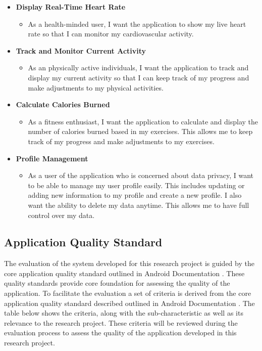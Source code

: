 \begin{itemize}[label={},leftmargin=*]
    \item \textbf{Display Real-Time Heart Rate}
      \begin{itemize}[label={},leftmargin=*]
        \item As a health-minded user, I want the application to show my live heart rate so that I can monitor my cardiovascular activity.
      \end{itemize}

    \item \textbf{Track and Monitor Current Activity}
      \begin{itemize}[label={},leftmargin=*]
        \item As an physically active individuals, I want the application to track and display my current activity so that I can keep track of my progress and make adjustments to my physical activities.
      \end{itemize}

    \item \textbf{Calculate Calories Burned}
      \begin{itemize}[label={},leftmargin=*]
        \item As a fitness enthusiast, I want the application to calculate and display the number of calories burned based in my exercises. This allows me to keep track of my progress and make adjustments to my exercises.
      \end{itemize}  

    \item \textbf{Profile Management}
      \begin{itemize}[label={},leftmargin=*]
        \item As a user of the application who is concerned about data privacy, I want to be able to manage my user profile easily. This includes updating or adding new information to my profile and create a new profile. I also want the ability to delete my data anytime. This allows me to have full control over my data.
      \end{itemize}
  \end{itemize}


\subsection{Application Quality Standard}
The evaluation of the system developed for this research project is guided by the core application quality standard outlined in Android Documentation \autocite{androidqualityguidelines}. These quality standards provide core foundation for assessing the quality of the application. To facilitate the evaluation a set of criteria is derived from the core application quality standard described outlined in Android Documentation \autocite{androidqualityguidelines}. The table below shows the criteria, along with the sub-characteristic as well as its relevance to the research project. These criteria will be reviewed during the evaluation process to assess the quality of the application developed in this research project.
